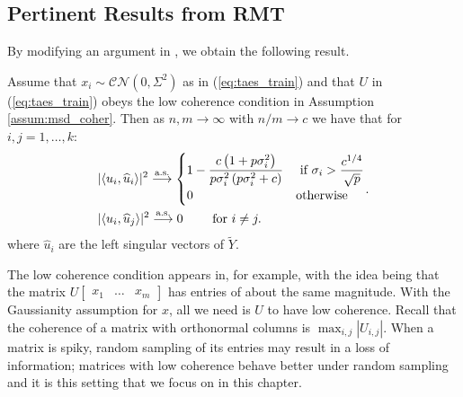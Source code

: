 \subsection{Pertinent Results from RMT}\label{sec:rmt}

By modifying an argument in  \cite{benaych2011singular}, we obtain the following result.
\begin{Th}\label{th:angles}
Assume that $x_i \sim \mathcal{CN}(0,\Sigma^2)$ as in (\ref{eq:taes_train}) and that $U$
in (\ref{eq:taes_train}) obeys the low coherence condition in Assumption
\ref{assum:msd_coher}. Then as $n,m \to \infty$ with $n/m \to c$ we have that
for $i,j = 1, \ldots, k$: 
\begin{equation*}
\begin{aligned}
&|\langle u_i,\widehat{u}_i\rangle|^2\overset{\textrm{a.s.}}{\longrightarrow}
\begin{cases}
1-\dfrac{c\left(1+p\sigma_i^2\right)}{p\sigma_i^2\left(p\sigma_i^2 + c\right)} & \text{ if } \sigma_{i}>\dfrac{c^{1/4}}{\sqrt{p}}\\
0 & \textrm{otherwise}\\
\end{cases}\\
&|\langle u_i,\widehat{u}_j\rangle|^2\overset{\textrm{a.s.}}{\longrightarrow} 0 \qquad \textrm{ for } i \neq j.\\
\end{aligned}.
\end{equation*}
where $\widehat{u}_i$ are the left singular vectors of $\widetilde{Y}$.
\end{Th}

The low coherence condition appears in, for example, \cite{balzano2010high} with the idea
being that the matrix $U \begin{bmatrix} x_{1} & \ldots & x_{m} \end{bmatrix}$ has entries
of about the same magnitude. With the Gaussianity assumption for $x$, all we need is $U$
to have low coherence. Recall that the coherence of a matrix with orthonormal columns is
$\max_{i,j}|U_{i,j}|$. When a matrix is spiky, random sampling of its entries may result
in a loss of information; matrices with low coherence behave better under random sampling
and it is this setting that we focus on in this chapter.

